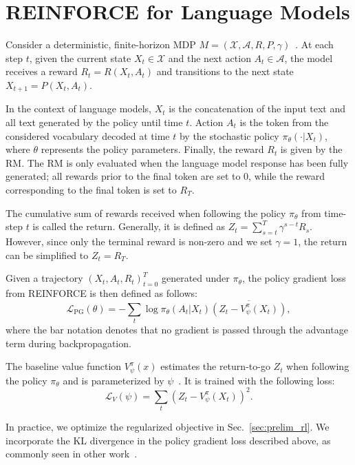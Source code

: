 \documentclass[11pt]{article}
\begin{document}
\section{REINFORCE for Language Models}
\label{sec:rl_for_lms}

Consider a deterministic, finite-horizon MDP $M = (\mathcal{X},\mathcal{A},R,P,\gamma)$~\citep{howard1960dynamic}. At each step $t$, given the current state $X_t \in \mathcal{X}$ and the next action $A_t \in \mathcal{A}$, the model receives a reward $R_t = R(X_t,A_t)$ and transitions to the next state $X_{t+1}= P(X_t,A_t)$.

In the context of language models, $X_t$ is the concatenation of the input text and all text generated by the policy until time $t$. Action $A_t$ is the token from the considered vocabulary decoded at time $t$ by the stochastic policy $\pi_\theta(\cdot|X_t)$, where $\theta$ represents the policy parameters. Finally, the reward $R_t$ is given by the RM. The RM is only evaluated when the language model response has been fully generated; all rewards prior to the final token are set to $0$, while the reward corresponding to the final token is set to $R_{T}$.

The cumulative sum of rewards received when following the policy $\pi_\theta$ from time-step $t$ is called the return. Generally, it is defined as $Z_t= \sum_{s=t}^{T} \gamma^{s-t} R_s$. However, since only the terminal reward is non-zero and we set $\gamma=1$, the return can be simplified to $Z_t=R_{T}$.

Given a trajectory $(X_t,A_t,R_t)_{t=0}^{T}$ generated under $\pi_\theta$, the policy gradient loss from REINFORCE is then defined as follows:
\begin{equation*}
    \mathcal{L}_\text{PG}(\theta)=-\sum_{t} \log \pi_\theta (A_t|X_t) \overline{\left(Z_t - V^{\pi}_\psi(X_t)\right)},
    \label{eq:pg-estimator}
\end{equation*}
\noindent where the bar notation denotes that no gradient is passed through the advantage term during backpropagation.

The baseline value function $V^\pi_\psi(x)$ estimates the return-to-go $Z_t$ when following the policy $\pi_\theta$ and is parameterized by $\psi$~\citep{williams1992simple,sutton1999policy}. It is trained with the following loss:
$$\mathcal{L}_V(\psi)=\sum_t (Z_t-V^\pi_\psi(X_t))^2.$$

In practice, we optimize the regularized objective in Sec.~\ref{sec:prelim_rl}. We incorporate the KL divergence in the policy gradient loss described above, as commonly seen in other work~\citep{jaques2017sequence}.  
\end{document}
